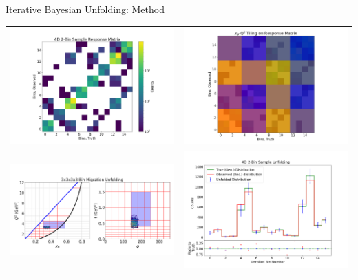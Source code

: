 \documentclass[aspectratio=169]{beamer}
\begin{document}
\begin{frame}{Iterative Bayesian Unfolding: Method}
     \begin{center}
            \begin{tabular}{cc}
                \includegraphics[width=0.249345\linewidth]{Main/ibu/4d-2n_example/4D_2bin_sample_response_matrix.png} & 
                \includegraphics[width=0.249345\linewidth]{Main/ibu/4d-2n_example/plaid/4D_2bin_sample_response_matrix_xb_q2.png} \\
                \includegraphics[width=0.249345\linewidth]{Main/ibu/kerneling/bin_migration_0_0_0_0.png} & 
                \includegraphics[width=0.249345\linewidth]{Main/ibu/4d-2n_example/4D_2bin_sample_unfolding.png} \\
            \end{tabular}
        \end{center}

\end{frame}
\end{document}
